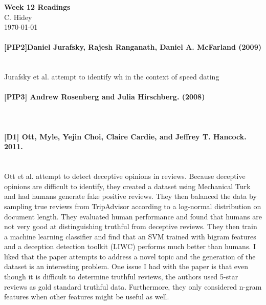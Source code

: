 \documentclass[12pt]{article}
\begin{document}
\begin{center}
  \textbf{Week 12 Readings} \\
  C. Hidey \\
  \today
\end{center}


\paragraph{{\bf [PIP2]Daniel Jurafsky, Rajesh Ranganath, Daniel A. McFarland (2009) }}
\text{} \\
Jurafsky et al. attempt to identify wh
in the context of speed dating

\paragraph{{\bf [PIP3] Andrew Rosenberg and Julia Hirschberg. (2008)}}
\text{} \\


\paragraph{{\bf [D1] Ott, Myle, Yejin Choi, Claire Cardie, and Jeffrey T. Hancock. 2011.}}
\text{} \\
Ott et al. attempt to detect deceptive opinions in reviews.  Because deceptive opinions are
difficult to identify, they created a dataset using Mechanical Turk and had humans generate
fake positive reviews.  They then balanced the data by sampling true reviews from TripAdvisor
according to a log-normal distribution on document length.  They evaluated human performance
and found that humans are not very good at distinguishing truthful from deceptive reviews.
They then train a machine learning classifier and find that an SVM trained with bigram features
and a deception detection toolkit (LIWC) performs much better than humans.
I liked that the paper attempts to address a novel topic and the generation of the dataset is an
interesting problem.
One issue I had with the paper is that even though it is difficult to determine truthful
reviews, the authors used 5-star reviews as gold standard truthful data.
Furthermore, they only considered n-gram features when other features might be useful as well.
\end{document}
